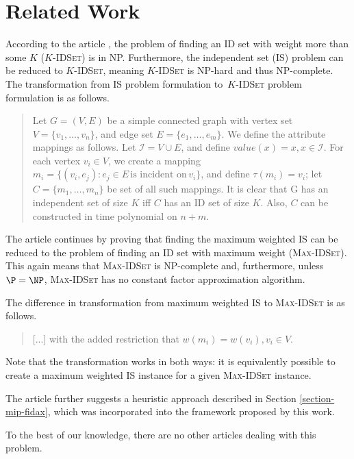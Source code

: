 \chapter{Related Work}
\label{chapter-research}

According to the article \cite[Chapter~4]{fidax}, the problem of finding an ID set with weight more than some $K$ ($K$-\textsc{IDSet}) is in NP. Furthermore, the independent set (IS) problem can be reduced to $K$-\textsc{IDSet}, meaning $K$-\textsc{IDSet} is NP-hard and thus NP-complete. The transformation from IS problem formulation to~$K$-\textsc{IDSet} problem formulation is as follows.

\begin{quote}
Let $G = (V, E)$ be a simple connected graph with vertex set $V = \{v_1, \ldots, v_n\}$, and edge set $E = \{e_1, \ldots, e_m\}$. We define the attribute mappings as follows. Let $ \mathcal{I} = V \cup E$, and define $value(x) = x, x \in \mathcal{I}$. For each vertex $v_i \in V$, we create a mapping $m_i = \{(v_i, e_j): e_j \in E \,\text{is incident on}\, v_i \}$, and define $\tau(m_i) = v_i$; let $C = \{m_1, \ldots, m_n\}$ be set of all such mappings. It is clear that G has an independent set of size $K$ iff $C$ has an ID set of size $K$. Also, $C$ can be constructed in time polynomial on $n+m$.
\end{quote}

The article continues by proving that finding the maximum weighted IS can be reduced to the problem of finding an ID set with maximum weight (\textsc{Max-IDSet}). This again means that \textsc{Max-IDSet} is NP-complete and, furthermore, unless $\P = \NP$, \textsc{Max-IDSet} has no constant factor approximation algorithm.

The difference in transformation from maximum weighted IS to \textsc{Max-IDSet} is as follows.

\begin{quote}
[...] with the added restriction that $w(m_i) = w(v_i), v_i \in V$.
\end{quote}

Note that the transformation works in both ways: it is equivalently possible to create a maximum weighted IS instance for a given \textsc{Max-IDSet} instance.

The article further suggests a heuristic approach described in Section \ref{section-mip-fidax}, which was incorporated into the framework proposed by this work.

To the best of our knowledge, there are no other articles dealing with this problem.\\

